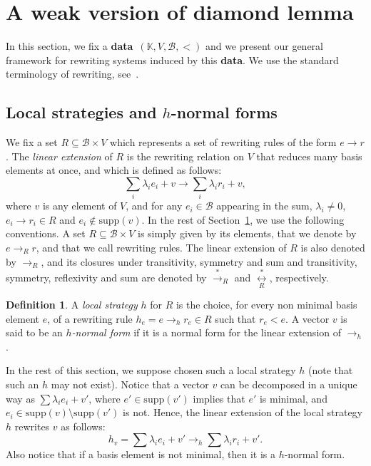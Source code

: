 \documentclass[10pt]{easychair}
\theoremstyle{definition}
\newtheorem{definition}[theorem]{Definition}
\newcommand\secDeux{A weak version of diamond lemma}
\newcommand\secDeuxUn{Local strategies and $h$-normal forms}
\newcommand\data{{\color{red}\bf data}}
\newcommand\supp{\text{supp}}
\newcommand\basis{\mathscr{B}}
\newcommand\K{\mathbb{K}}
\newcommand\rewR{\to_R}
\newcommand\rewh{\to_h}
\newcommand\transR{\overset{*}{\to}_R}
\newcommand\equivR{\underset{R}{\overset{*}{\leftrightarrow}}}
\begin{document}
\section{\secDeux}\label{sec:deux}

In this section, we fix a \data\ $(\K,V,\basis,<)$ and we present our 
general framework for rewriting systems induced by this \data. We use the
standard terminology of rewriting, see~\cite{MR1629216}.

\subsection{\secDeuxUn}\label{sec:deuxUn}

We fix a set $R\subseteq\basis\times V$ which represents a set of
rewriting rules of the form $e\to r$. The {\em linear extension} of $R$
is the rewriting relation on $V$ that reduces many basis elements at
once, and which is defined as follows:
\begin{equation}\label{equ:rewriting_step}
  \sum_i\lambda_ie_i+v\to\sum_i\lambda_ir_i+v,
\end{equation}
where $v$ is any element of $V$, and for any $e_i\in\basis$ appearing in
the sum, $\lambda_i\neq 0$, $e_i\to r_i\in R$ and $e_i\notin\supp(v)$. In
the rest of Section~\ref{sec:deux}, we use the following conventions. A
set $R\subseteq\basis\times V$ is simply given by its elements, that we
denote by $e\rewR r$, and that we call rewriting rules. The linear
extension of $R$ is also denoted by $\rewR$, and its closures under
transitivity, symmetry and sum and transitivity, symmetry, reflexivity
and sum are denoted by $\transR$ and $\equivR$, respectively.

\begin{definition}
  A \emph{local strategy} $h$ for $R$ is the choice, for every non
  minimal basis element $e$, of a rewriting rule $h_e=e\rewh r_e\in R$
  such that $r_e<e$. A vector $v$ is said to be an \emph{$h$-normal form}
  if it is a normal form for the linear extension of $\rewh$.
\end{definition}

In the rest of this section, we suppose chosen such a local strategy $h$
(note that such an $h$ may not exist). Notice that a vector $v$ can be
decomposed in a unique way as $\sum\lambda_ie_i+v'$, where
$e'\in\supp(v')$ implies that $e'$ is minimal, and
$e_i\in\supp(v)\setminus\supp(v')$ is not. Hence, the linear extension of
the local strategy $h$ rewrites $v$ as follows:
\begin{equation}\label{equ:well-formed_rewriting_step}
  h_v = \sum\lambda_ie_i+v'\rewh\sum\lambda_ir_i+v'.
\end{equation}
Also notice that if a basis element is not minimal, then it is a
$h$-normal form.
\end{document}
